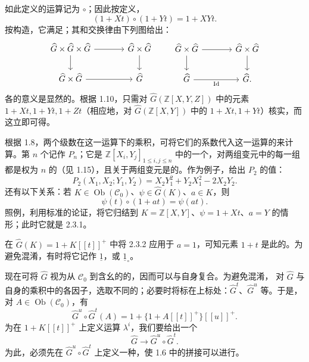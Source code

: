 如此定义的运算记为 $\circ$；因此按定义，
\[
(1+Xt)\circ(1+Yt)=1+XYt.
\tag{2.3.1}
\]
按构造，它满足；其和交换律由下列图给出：
\[
\begin{tikzcd}[column sep=large]
\widehat G\times\widehat G\times\widehat G\arrow[r]\arrow[d] &
\widehat G\times\widehat G\arrow[d]\\
\widehat G\times\widehat G\arrow[r] & \widehat G
\end{tikzcd}
\qquad
\begin{tikzcd}[column sep=large]
\widehat G\times\widehat G\arrow[r]\arrow[d] &
\widehat G\times\widehat G\arrow[d]\\
\widehat G\arrow[r,"\operatorname{Id}"'] & \widehat G.
\end{tikzcd}
\]
各的意义是显然的。根据 1.10，只需对 $\widehat G(\mathbb Z[X,Y,Z])$ 中的元素 $1+Xt,1+Yt,1+Zt$（相应地，对 $\widehat G(\mathbb Z[X,Y])$ 中的 $1+Xt,1+Yt$）核实，而这立即可得。

根据 1.8，两个级数在这一运算下的乘积，可将它们的系数代入这一运算的来计算。第 $n$ 个记作 $P_n$；它是 $\mathbb Z[X_i,Y_j]_{1\leqslant i,j\leqslant n}$ 中的一个，对两组变元中的每一组都是权为 $n$ 的（见 1.15），且关于两组变元是的。作为例子，给出 $P_2$ 的值：
\[
P_2(X_1,X_2;Y_1,Y_2)=X_2Y_1^2+Y_2X_1^2-2X_2Y_2.
\]
还有以下关系：若 $K\in\operatorname{Ob}(\mathscr C_0)$、$\psi\in\widehat G(K)$、$a\in K$，则
\[
\psi(t)\circ(1+at)=\psi(at).
\tag{2.3.2}
\]
照例，利用标准的论证，将它归结到 $K=\mathbb Z[X,Y]$、$\psi=1+Xt$、$a=Y$ 的情形；此时它就是 2.3.1。

在 $\widehat G(K)=1+K[[t]]^+$ 中将 2.3.2 应用于 $a=1$，可知元素 $1+t$ 是此的。为避免混淆，有时将它记作 $\underline1$，或 $\underline1_\circ$。

现在可将 $\widehat G$ 视为从 $\mathscr C_0$ 到含幺的的，因而可以与自身复合。为避免混淆，
对 $\widehat G$ 与自身的乘积中的各因子，选取不同的；必要时将标在上标处：$\widehat G^t$、$\widehat G^u$ 等。于是，对 $A\in\operatorname{Ob}(\mathscr C_0)$，有
\[
\widehat G^u\circ\widehat G^t(A)=1+\{1+A[[t]]^+\}[[u]]^+.
\]
为在 $1+K[[t]]^+$ 上定义运算 $\lambda^i$，我们要给出一个
\[
\widehat G\longrightarrow\widehat G^u\circ\widehat G^t.
\]
为此，必须先在 $\widehat G^u\circ\widehat G^t$ 上定义一种，使 1.6 中的拼接可以进行。

